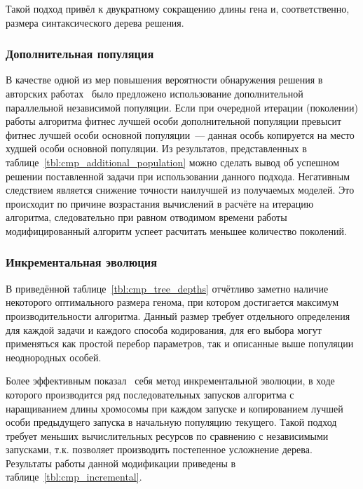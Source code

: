 Такой подход привёл к двукратному сокращению длины гена и, соответственно, размера синтаксического дерева решения.


\subsubsection{Дополнительная популяция}

В качестве одной из мер повышения вероятности обнаружения решения в авторских работах~\cite{SergMir_03_2013_vkntu, SergMir_04_2013_smolensk} было предложено использование дополнительной параллельной независимой популяции. Если при очередной итерации (поколении) работы алгоритма фитнес лучшей особи дополнительной популяции превысит фитнес лучшей особи основной популяции~--- данная особь копируется на место худшей особи основной популяции. Из результатов, представленных в таблице~\ref{tbl:cmp_additional_population} можно сделать вывод об успешном решении поставленной задачи при использовании данного подхода. Негативным следствием является снижение точности наилучшей из получаемых моделей. Это происходит по причине возрастания вычислений в расчёте на итерацию алгоритма, следовательно при равном отводимом времени работы модифицированный алгоритм успеет расчитать меньшее количество поколений.




\subsubsection{Инкрементальная эволюция}

В приведённой таблице~\ref{tbl:cmp_tree_depths} отчётливо заметно наличие некоторого оптимального размера генома, при котором достигается максимум производительности алгоритма. Данный размер требует отдельного определения для каждой задачи и каждого способа кодирования, для его выбора могут применяться как простой перебор параметров, так и описанные выше популяции неоднородных особей.



Более эффективным показал~\cite{SergMir_04_2013_varna, SergMir_04_2013_sovr} себя метод инкрементальной эволюции, в ходе которого производится ряд последовательных запусков алгоритма с наращиванием длины хромосомы при каждом запуске и копированием лучшей особи предыдущего запуска в начальную популяцию текущего. Такой подход требует меньших вычислительных ресурсов по сравнению с независимыми запусками, т.к. позволяет производить постепенное усложнение дерева. Результаты работы данной модификации приведены в таблице~\ref{tbl:cmp_incremental}.


